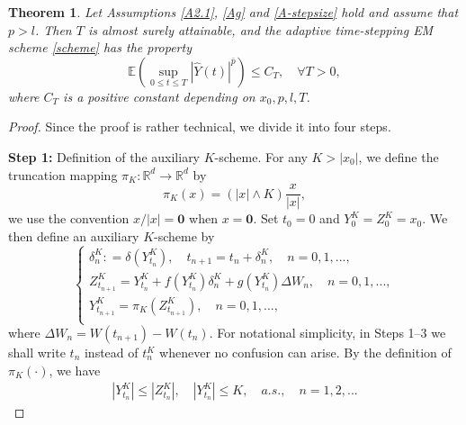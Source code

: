 \documentclass[preprint,12pt,compress]{elsarticle}
\newtheorem{theorem}{Theorem}[section] %
\begin{document}
\begin{theorem}   \label{th2.1}
	Let Assumptions \ref{A2.1}, \ref{Ag} and \ref{A-stepsize} hold and assume that $p > l$. Then $T$ is almost surely attainable, and the adaptive time-stepping EM scheme \eqref{scheme} has the property
	\begin{equation}   \label{a7}
		\mathbb{E}\left( {\mathop {\sup }\limits_{0 \le t \le T} {{\left| {\hat Y(t)} \right|}^{\bar p}}} \right) \le C_T, \quad \forall T>0,
	\end{equation}
where $C_T$ is a positive constant depending on $x_0, p, l, T$.	
\end{theorem}

\begin{proof}
Since the proof is rather technical, we divide it into four steps.

\textbf{Step 1:} Definition of the auxiliary $K$-scheme.
For any $K > |x_0|$, we define the truncation mapping ${\pi _K}:{\mathbb{R}^d} \to {\mathbb{R}^d}$ by
\begin{equation}  \label{pi}
	{\pi _K}(x) = \left( {\left| x \right| \wedge K} \right)\frac{x}{{\left| x \right|}},
\end{equation}
we use the convention $x/|x|=\textbf{0}$ when $x = \mathbf{0}$.
Set $t_0= 0$ and ${Y_0^K = Z_0^K = {x_0}}$. We then define an auxiliary $K$-scheme by
\begin{equation}   \label{K-scheme}
	\left\{  
	\begin{array}{l}
		\delta _n^{K}: = \delta (Y_{{t_n}}^K), \quad t_{n+1} = t_n + \delta _n^{K }, \quad n = 0,1,...,  \\
		{Z_{{t_{n + 1}}}^K = Y_{{t_n}}^K + f(Y_{{t_n}}^K)\delta _n^{K } + g(Y_{{t_n}}^K)\Delta W_n}, \quad n = 0,1,...,  \\
		{Y_{{t_{n + 1}}}^K = {\pi _K}(Z_{{t_{n + 1}}}^K)}, \quad n = 0,1,...,  \\  
	\end{array}
	\right.
\end{equation}
where $\Delta W_n = W({t_{n + 1}}) - W({t_n})$. 
For notational simplicity, in Steps 1--3 we shall write $t_n$ instead of $t_n^K$ whenever no confusion can arise.
By the definition of $\pi_K(\cdot)$, we have
\begin{equation}  \label{a33}
	\begin{split}
		\left| {Y_{{t_n}}^K} \right| \le \left| {Z_{{t_n}}^K} \right|, \quad \left| {Y_{{t_n}}^K} \right| \le K, \quad a.s., \quad n =1,2,...
	\end{split}
\end{equation}

\end{proof}
\end{document}

